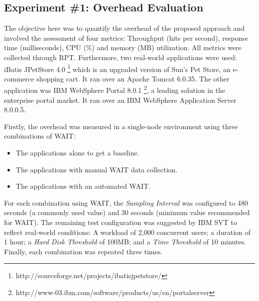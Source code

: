 \documentclass[runningheads,a4paper]{llncs}
\begin{document}
\vspace{-7pt}
\subsection{Experiment \#1: Overhead Evaluation}
\vspace{-7pt}

The objective here was to quantify the overhead of the proposed approach and
involved the assessment of four metrics: Throughput (hits per second), response
time (milliseconds), CPU (\%) and memory (MB) utilization. All metrics were
collected through RPT. Furthermore, two real-world applications were used:
iBatis JPetStore 4.0 \footnote{http://sourceforge.net/projects/ibatisjpetstore/}
which is an upgraded version of Sun's Pet Store, an e-commerce shopping cart. It
ran over an Apache Tomcat 6.0.35. The other application was IBM WebSphere Portal 
8.0.1 \footnote{http://www-03.ibm.com/software/products/us/en/portalserver},
a leading solution in the enterprise portal market. It ran over an IBM WebSphere
Application Server 8.0.0.5.

Firstly, the overhead was measured in a single-node environment using three
combinations of WAIT: 
\vspace{-7pt}
\begin{itemize}
	\item The applications alone to get a baseline.
	\item The applications with manual WAIT data collection.
	\item The applications with an automated WAIT.
\end{itemize}

For each combination using WAIT, the \emph{Sampling Interval} was configured
to 480 seconds (a commonly used value) and 30 seconds (minimum value recommended
for WAIT). The remaining test configuration was suggested by IBM SVT to
reflect real-world conditions: A workload of 2,000 concurrent users; a duration
of 1 hour; a \emph{Hard Disk Threshold} of 100MB; and a \emph{Time Threshold} of
10 minutes. Finally, each combination was repeated three times.
\end{document}
